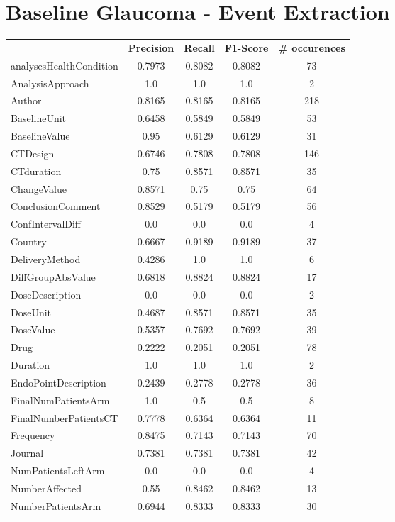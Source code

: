 \section{Baseline Glaucoma - Event Extraction}
\begin{longtable}{ l c c c c}
 & \textbf{Precision} & \textbf{Recall} & \textbf{F1-Score} & \textbf{\# occurences} \\ \cline{1-5}
analysesHealthCondition & 0.7973 & 0.8082 & 0.8082 & 73\\
AnalysisApproach & 1.0 & 1.0 & 1.0 & 2\\
Author & 0.8165 & 0.8165 & 0.8165 & 218\\
BaselineUnit & 0.6458 & 0.5849 & 0.5849 & 53\\
BaselineValue & 0.95 & 0.6129 & 0.6129 & 31\\
CTDesign & 0.6746 & 0.7808 & 0.7808 & 146\\
CTduration & 0.75 & 0.8571 & 0.8571 & 35\\
ChangeValue & 0.8571 & 0.75 & 0.75 & 64\\
ConclusionComment & 0.8529 & 0.5179 & 0.5179 & 56\\
ConfIntervalDiff & 0.0 & 0.0 & 0.0 & 4\\
Country & 0.6667 & 0.9189 & 0.9189 & 37\\
DeliveryMethod & 0.4286 & 1.0 & 1.0 & 6\\
DiffGroupAbsValue & 0.6818 & 0.8824 & 0.8824 & 17\\
DoseDescription & 0.0 & 0.0 & 0.0 & 2\\
DoseUnit & 0.4687 & 0.8571 & 0.8571 & 35\\
DoseValue & 0.5357 & 0.7692 & 0.7692 & 39\\
Drug & 0.2222 & 0.2051 & 0.2051 & 78\\
Duration & 1.0 & 1.0 & 1.0 & 2\\
EndoPointDescription & 0.2439 & 0.2778 & 0.2778 & 36\\
FinalNumPatientsArm & 1.0 & 0.5 & 0.5 & 8\\
FinalNumberPatientsCT & 0.7778 & 0.6364 & 0.6364 & 11\\
Frequency & 0.8475 & 0.7143 & 0.7143 & 70\\
Journal & 0.7381 & 0.7381 & 0.7381 & 42\\
NumPatientsLeftArm & 0.0 & 0.0 & 0.0 & 4\\
NumberAffected & 0.55 & 0.8462 & 0.8462 & 13\\
NumberPatientsArm & 0.6944 & 0.8333 & 0.8333 & 30\\

\end{longtable}
